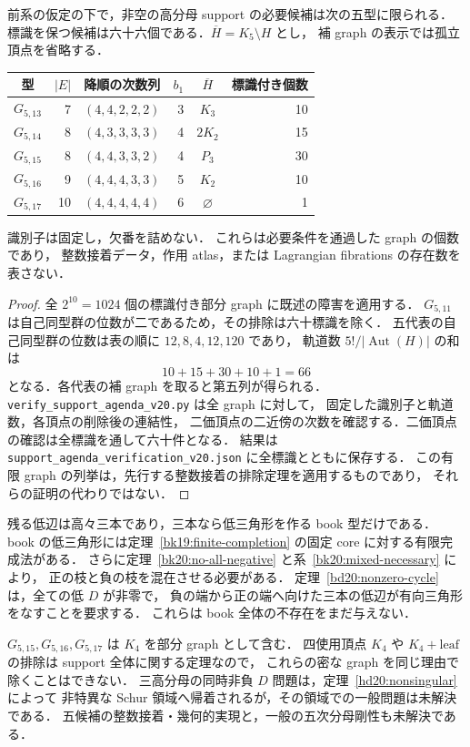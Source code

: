 \begin{corollary}[五型六十六標識への帰着]
\label{sf20:remaining-support}
前系の仮定の下で，非空の高分母 support の必要候補は次の五型に限られる．
標識を保つ候補は六十六個である．$\overline H=K_5\setminus H$ とし，
補 graph の表示では孤立頂点を省略する．
\begin{center}\small
\begin{tabular}{crcrcr}
型&$|E|$&降順の次数列&$b_1$&$\overline H$&標識付き個数\\\hline
$G_{5,13}$&7&$(4,4,2,2,2)$&3&$K_3$&10\\
$G_{5,14}$&8&$(4,3,3,3,3)$&4&$2K_2$&15\\
$G_{5,15}$&8&$(4,4,3,3,2)$&4&$P_3$&30\\
$G_{5,16}$&9&$(4,4,4,3,3)$&5&$K_2$&10\\
$G_{5,17}$&10&$(4,4,4,4,4)$&6&$\varnothing$&1
\end{tabular}
\end{center}
識別子は固定し，欠番を詰めない．
これらは必要条件を通過した graph の個数であり，
整数接着データ，作用 atlas，または Lagrangian fibrations の存在数を表さない．
\end{corollary}

\begin{proof}
全 $2^{10}=1024$ 個の標識付き部分 graph に既述の障害を適用する．
$G_{5,11}$ は自己同型群の位数が二であるため，その排除は六十標識を除く．
五代表の自己同型群の位数は表の順に $12,8,4,12,120$ であり，
軌道数 $5!/|\operatorname{Aut}(H)|$ の和は
\[
 10+15+30+10+1=66
\]
となる．各代表の補 graph を取ると第五列が得られる．
\nolinkurl{verify_support_agenda_v20.py} は全 graph に対して，
固定した識別子と軌道数，各頂点の削除後の連結性，
二価頂点の二近傍の次数を確認する．二価頂点の確認は全標識を通して六十件となる．
結果は \nolinkurl{support_agenda_verification_v20.json} に全標識とともに保存する．
この有限 graph の列挙は，先行する整数接着の排除定理を適用するものであり，
それらの証明の代わりではない．
\end{proof}

残る低辺は高々三本であり，三本なら低三角形を作る book 型だけである．
book の低三角形には定理~\ref{bk19:finite-completion} の固定 core に対する有限完成法がある．
さらに定理~\ref{bk20:no-all-negative} と系~\ref{bk20:mixed-necessary} により，
正の枝と負の枝を混在させる必要がある．
定理~\ref{bd20:nonzero-cycle} は，全ての低 $D$ が非零で，
負の端から正の端へ向けた三本の低辺が有向三角形をなすことを要求する．
これらは book 全体の不存在をまだ与えない．

$G_{5,15},G_{5,16},G_{5,17}$ は $K_4$ を部分 graph として含む．
四使用頂点 $K_4$ や $K_4+\mathrm{leaf}$ の排除は support 全体に関する定理なので，
これらの密な graph を同じ理由で除くことはできない．
三高分母の同時非負 $D$ 問題は，定理~\ref{hd20:nonsingular} によって
非特異な Schur 領域へ帰着されるが，その領域での一般問題は未解決である．
五候補の整数接着・幾何的実現と，一般の五次分母剛性も未解決である．
